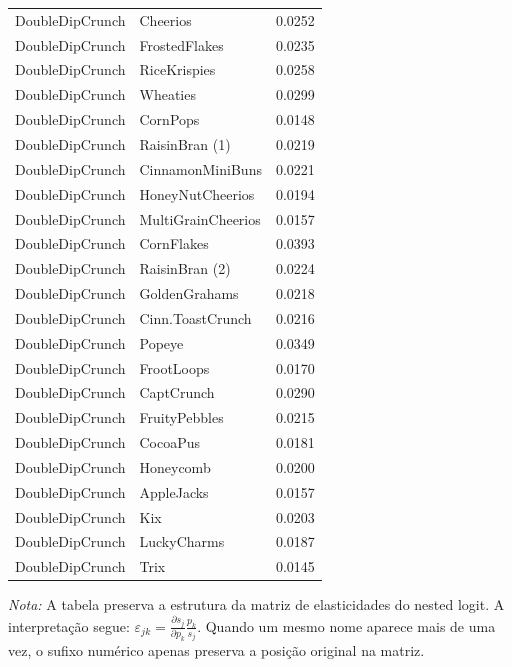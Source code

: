 \begin{table}[H]
\begin{tabular}{llr}
DoubleDipCrunch & Cheerios & 0.0252 \\
DoubleDipCrunch & FrostedFlakes & 0.0235 \\
DoubleDipCrunch & RiceKrispies & 0.0258 \\
DoubleDipCrunch & Wheaties & 0.0299 \\
DoubleDipCrunch & CornPops & 0.0148 \\
DoubleDipCrunch & RaisinBran (1) & 0.0219 \\
DoubleDipCrunch & CinnamonMiniBuns & 0.0221 \\
DoubleDipCrunch & HoneyNutCheerios & 0.0194 \\
DoubleDipCrunch & MultiGrainCheerios & 0.0157 \\
DoubleDipCrunch & CornFlakes & 0.0393 \\
DoubleDipCrunch & RaisinBran (2) & 0.0224 \\
DoubleDipCrunch & GoldenGrahams & 0.0218 \\
DoubleDipCrunch & Cinn.ToastCrunch & 0.0216 \\
DoubleDipCrunch & Popeye & 0.0349 \\
DoubleDipCrunch & FrootLoops & 0.0170 \\
DoubleDipCrunch & CaptCrunch & 0.0290 \\
DoubleDipCrunch & FruityPebbles & 0.0215 \\
DoubleDipCrunch & CocoaPus & 0.0181 \\
DoubleDipCrunch & Honeycomb & 0.0200 \\
DoubleDipCrunch & AppleJacks & 0.0157 \\
DoubleDipCrunch & Kix & 0.0203 \\
DoubleDipCrunch & LuckyCharms & 0.0187 \\
DoubleDipCrunch & Trix & 0.0145 \\
\bottomrule
\end{tabular}

\vspace{0.3em}
\footnotesize
\textit{Nota:} A tabela preserva a estrutura da matriz de elasticidades do nested logit. A interpretação segue: $\varepsilon_{jk}=\frac{\partial s_j}{\partial p_k}\frac{p_k}{s_j}$. Quando um mesmo nome aparece mais de uma vez, o sufixo numérico apenas preserva a posição original na matriz.
\end{table}
\endgroup


